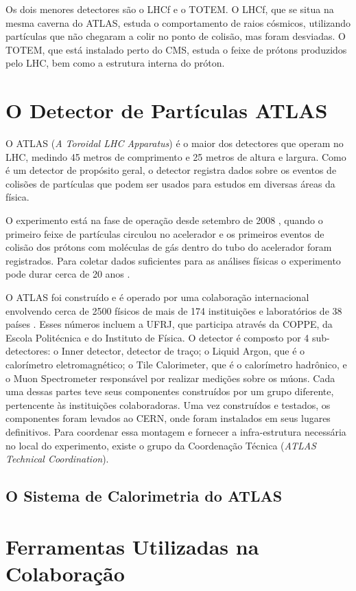 Os dois menores detectores são o LHCf e o TOTEM. O LHCf, que se situa na mesma
caverna do ATLAS, estuda o comportamento de raios cósmicos, utilizando
partículas que não chegaram a colir no ponto de colisão, mas foram desviadas.
O TOTEM, que está instalado perto do CMS, estuda o feixe de prótons produzidos
pelo LHC, bem como a estrutura interna do próton.

\section{O Detector de Partículas ATLAS}
\label{sec:ATLAS}

O ATLAS (\textit{A Toroidal LHC Apparatus}) é o maior dos detectores que operam
no LHC, medindo 45 metros de comprimento e 25 metros de altura e largura. Como é
um detector de propósito geral, o detector registra dados sobre os eventos de
colisões de partículas que podem ser usados para estudos em diversas áreas da
física. 

O experimento está na fase de operação desde setembro de 2008 \cite{webLHCFirstBeam},
quando o primeiro feixe de partículas circulou no acelerador e os primeiros
eventos de colisão dos prótons com moléculas de gás dentro do tubo do acelerador
foram registrados. Para coletar dados suficientes para as análises físicas o
experimento pode durar cerca de 20 anos \cite{ATLAS_TDR}.

O ATLAS foi construído e é operado por uma colaboração internacional envolvendo
cerca de 2500 físicos de mais de 174 instituições e laboratórios de 38 países
\cite{webATLAS}. Esses números incluem a UFRJ, que participa através da COPPE,
da Escola Politécnica e do Instituto de Física. O detector é composto por 4
sub-detectores: o Inner detector, detector de traço; o Liquid Argon, que é o
calorímetro eletromagnético; o Tile Calorimeter, que é o calorímetro hadrônico,
e o Muon Spectrometer responsável por realizar medições sobre os múons. Cada uma
dessas partes teve seus componentes construídos por um grupo diferente,
pertencente às instituições colaboradoras.  Uma vez construídos e testados, os
componentes foram levados ao CERN, onde foram instalados em seus lugares
definitivos. Para coordenar essa montagem e fornecer a infra-estrutura
necessária no local do experimento, existe o grupo da Coordenação Técnica
({\it ATLAS Technical Coordination}).

\subsection{O Sistema de Calorimetria do ATLAS}
\label{ssec:calorimetria}


\section{Ferramentas Utilizadas na Colaboração}
\label{sec:ferramentas}

